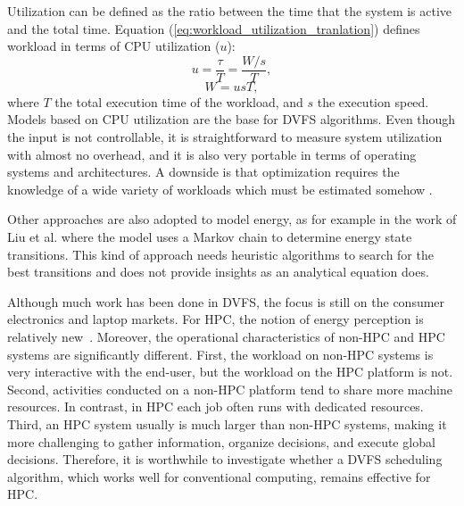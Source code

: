 Utilization can be defined as the ratio between the time that the system is active and the total time. Equation (\ref{eq:workload_utilization_tranlation}) defines workload in terms of CPU utilization ($u$):
\begin{equation}
u = \frac{\tau}{T} = \frac{W/s}{T},
\label{eq:utilization_definition}
\end{equation}
\begin{equation}
W = usT,
\label{eq:workload_utilization_tranlation}
\end{equation}
where $T$ the total execution time of the workload, and $s$ the execution speed.
Models based on CPU utilization are the base for DVFS algorithms. Even though the input is not controllable, it is straightforward  to measure system utilization with almost no overhead, and it is also very portable in terms of operating systems and architectures. 
A downside is that optimization requires the knowledge of a wide variety of workloads which must be estimated somehow \cite{Fu2018RaceMinimization, Group2012HandbookSahni}.


Other approaches are also adopted to model energy, as for example in the work of Liu et al. \cite{Liu2016IntelligentSupplies} where the model uses a Markov chain to determine energy state transitions. This kind of approach needs heuristic algorithms to search for the best transitions and does not provide insights as an analytical equation does.

Although much work has been done in DVFS, the focus is still on the consumer electronics and laptop markets. 
For HPC, the notion of energy perception is relatively new~\cite{Beckman2005MakingSupercomputing}. 
Moreover, the operational characteristics of non-HPC and HPC systems are significantly different. 
First, the workload on non-HPC systems is very interactive with the end-user, but the workload on the HPC platform is not. 
Second, activities conducted on a non-HPC platform tend to share more machine resources.
In contrast, in HPC each job often runs with dedicated resources. 
Third, an HPC system usually is much larger than non-HPC systems, making it more  challenging to gather information, organize decisions, and execute global decisions.
Therefore, it is worthwhile to investigate whether a DVFS scheduling algorithm, which works well for conventional computing, remains effective for HPC.

